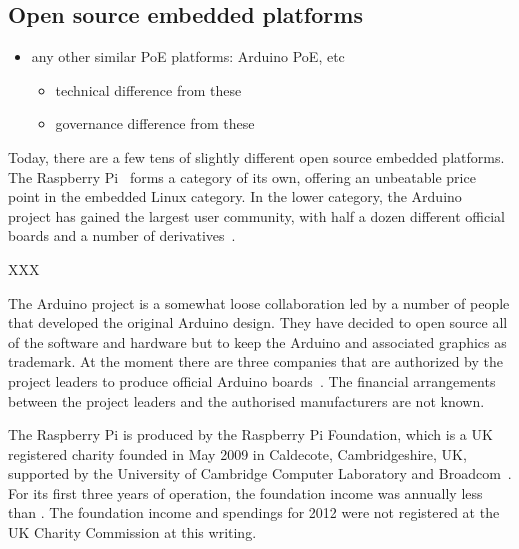 \documentclass[draft,a4paper]{siamltex}
\begin{document}
\subsection{Open source embedded platforms}

\begin{itemize}
  \item any other similar PoE platforms: Arduino PoE, etc
    \begin{itemize}
    \item technical difference from these
    \item governance difference from these
    \end{itemize}
\end{itemize}

Today, there are a few tens of slightly different open source embedded
platforms.  The Raspberry Pi~\cite{RasPi} forms a category of its own,
offering an unbeatable price point in the embedded Linux category.  In
the lower category, the Arduino~\cite{ArduinoProject,hribernik2011co}
project has gained the largest user community, with half a dozen
different official boards and a number of derivatives~\cite{XXX}.

XXX

The Arduino project is a somewhat loose collaboration led by a number of
people that developed the original Arduino design.  They have decided
to open source all of the software and hardware but to keep the
Arduino and associated graphics as trademark.  At the moment there are
three companies that are authorized by the project leaders to produce
official Arduino boards~\cite{ArduinoPolicy}.  The financial
arrangements between the project leaders and the authorised
manufacturers are not known.

The Raspberry Pi is produced by the Raspberry Pi Foundation, which is
a UK registered charity founded in May 2009 in Caldecote,
Cambridgeshire, UK, supported by the University of Cambridge Computer
Laboratory and Broadcom~\cite{RaspiFoundationWikipedia}.  For its
first three years of operation, the foundation income was annually
less than .  The foundation income and spendings for 2012
were not registered at the UK Charity Commission at this writing.
\end{document}
